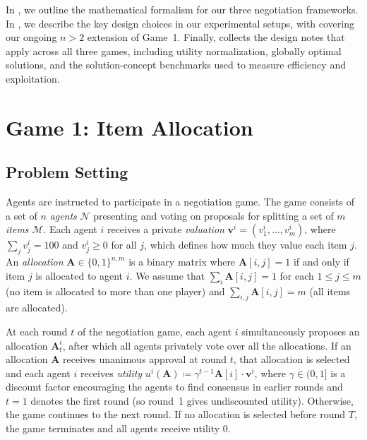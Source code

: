 In , we outline the mathematical formalism for our three negotiation frameworks. In , we describe the key design choices in our experimental setups, with  covering our ongoing $n > 2$ extension of Game~1. Finally,  collects the design notes that apply across all three games, including utility normalization, globally optimal solutions, and the solution-concept benchmarks used to measure efficiency and exploitation.

\section{Game 1: Item Allocation}

\subsection{Problem Setting}
\label{sec:game_1_problem_setting}

Agents are instructed to participate in a negotiation game.
The game consists of a set of $n$ \emph{agents} $\mathcal{N}$ presenting and voting on proposals for splitting a set of $m$ \emph{items} $\mathcal{M}$.
Each agent $i$ receives a private \emph{valuation} $\bm{v}^{i} = ( v^{i}_{1} , \dots,  v^{i}_{m} )$, where $\sum_j v^{i}_{j} = 100$ and $v^{i}_{j} \geq 0$ for all $j$, which defines how much they value each item $j$.
An \emph{allocation} $\bm{A} \in \{0,1\}^{n,m}$ is a binary matrix where $\bm{A}[i,j] = 1$ if and only if item $j$ is allocated to agent $i$.
We assume that $\sum_i \bm{A}[i,j] = 1$ for each $1 \leq j \leq m$ (no item is allocated to more than one player) and $\sum_{i,j} \bm{A}[i,j] = m$ (all items are allocated).

At each round $t$ of the negotiation game, each agent $i$ simultaneously proposes an allocation $\bm{A}^i_t$, after which all agents privately vote over all the allocations.
If an allocation $\bm{A}$ receives unanimous approval at round $t$, that allocation is selected and each agent $i$ receives \emph{utility} $u^i(\bm{A}) \coloneqq \gamma^{t-1} \bm{A}[i] \cdot \bm{v}^{i}$, where $\gamma \in (0,1]$ is a discount factor encouraging the agents to find consensus in earlier rounds and $t=1$ denotes the first round (so round~1 gives undiscounted utility).
Otherwise, the game continues to the next round.
If no allocation is selected before round $T$, the game terminates and all agents receive utility 0.

